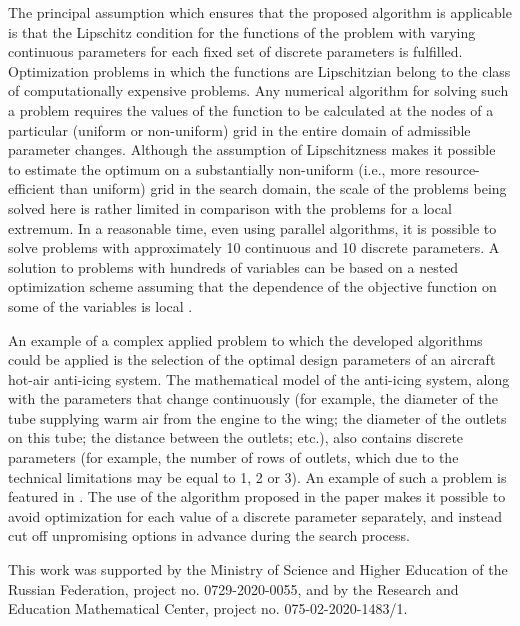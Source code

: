\documentclass[
11pt,%
tightenlines,%
twoside,%
onecolumn,%
nofloats,%
nobibnotes,%
nofootinbib,%
superscriptaddress,%
noshowpacs,%
centertags]%
{revtex4}
\begin{document}
The principal assumption which ensures that the proposed algorithm is applicable is that the Lipschitz condition for the functions of the problem with varying continuous parameters for each fixed set of discrete parameters is fulfilled.
Optimization problems in which the functions are Lipschitzian belong to the class of computationally expensive problems. Any numerical algorithm for solving such a problem requires the values of the function to be calculated at the nodes of a particular (uniform or non-uniform) grid in the entire domain of admissible parameter changes.
Although the assumption of Lipschitzness makes it possible to estimate the optimum on a substantially non-uniform (i.e., more resource-efficient than uniform) grid in the search domain, the scale of the problems being solved here is rather limited in comparison with the problems for a local extremum. In a reasonable time, even using parallel algorithms, it is possible to solve problems with approximately 10 continuous and 10 discrete parameters.
A solution to problems with hundreds of variables can be based on a nested optimization scheme assuming that the dependence of the objective function on some of the variables is local \cite{Barkalov2020_1}.

An example of a complex applied problem to which the developed algorithms could be applied is the selection of the optimal design parameters of an aircraft hot-air anti-icing system. The mathematical model of the anti-icing system, along with the parameters that change continuously (for example, the diameter of the tube supplying warm air from the engine to the wing; the diameter of the outlets on this tube; the distance between the outlets; etc.), also contains discrete parameters (for example, the number of rows of outlets, which due to the technical limitations may be equal to 1, 2 or 3). An example of such a problem is featured in \cite{Habashi}. The use of the algorithm proposed in the paper makes it possible to avoid optimization for each value of a discrete parameter separately, and instead cut off unpromising options in advance during the search process.



\begin{acknowledgments}
This work was supported by the Ministry of Science and Higher Education of the Russian Federation, project no. 0729-2020-0055, and by the Research and Education Mathematical Center, project no. 075-02-2020-1483/1.
\end{acknowledgments}
\end{document}
